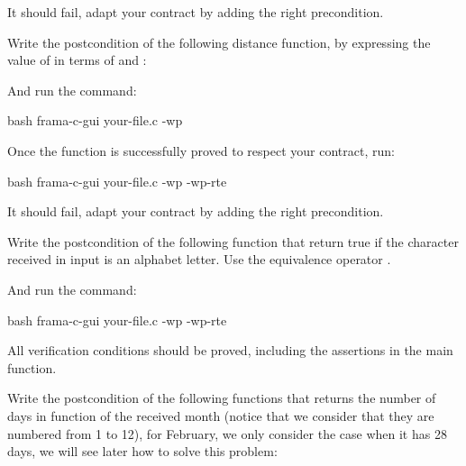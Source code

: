 It should fail, adapt your contract by adding the right precondition.




Write the postcondition of the following distance function, by expressing
the value of  in terms of  and
:




And run the command:


\begin{CodeBlock}{bash}
frama-c-gui your-file.c -wp
\end{CodeBlock}


Once the function is successfully proved to respect your contract, run:


\begin{CodeBlock}{bash}
frama-c-gui your-file.c -wp -wp-rte
\end{CodeBlock}


It should fail, adapt your contract by adding the right precondition.






Write the postcondition of the following function that return true if
the character received in input is an alphabet letter. Use the equivalence
operator \CodeInline{<==>}.





And run the command:


\begin{CodeBlock}{bash}
frama-c-gui your-file.c -wp -wp-rte
\end{CodeBlock}


All verification conditions should be proved, including the assertions in the
main function.






Write the postcondition of the following functions that returns the number
of days in function of the received month (notice that we consider that
they are numbered from 1 to 12), for February, we only consider the case
when it has 28 days, we will see later how to solve this problem:






